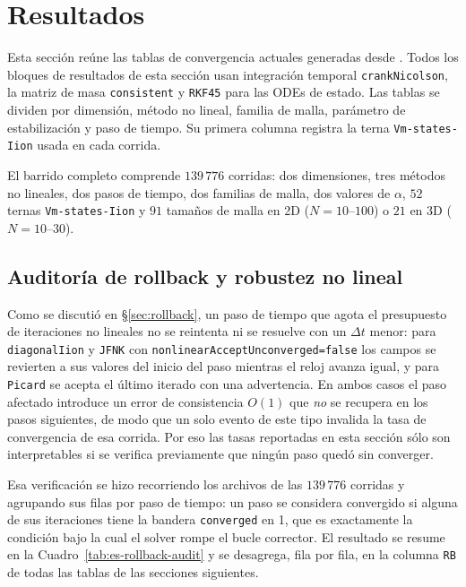 \documentclass[11pt,a4paper]{article}
\newcommand{\code}[1]{\texttt{\small #1}}
\begin{document}
\section{Resultados}

Esta sección reúne las tablas de convergencia actuales generadas desde
.
Todos los bloques de resultados de esta sección usan integración temporal \code{crankNicolson},
la matriz de masa \code{consistent} y \code{RKF45} para las ODEs de estado. Las tablas se
dividen por dimensión, método no lineal, familia de malla, parámetro de estabilización y paso
de tiempo. Su primera columna registra la terna \code{Vm-states-Iion} usada en cada corrida.

El barrido completo comprende $139\,776$ corridas: dos dimensiones, tres métodos no lineales,
dos pasos de tiempo, dos familias de malla, dos valores de $\alpha$, $52$ ternas
\code{Vm-states-Iion} y $91$ tamaños de malla en 2D ($N=10$--$100$) o $21$ en 3D
($N=10$--$30$).

\subsection{Auditoría de rollback y robustez no lineal}
\label{sec:es-auditoria-rollback-sec}

Como se discutió en \S\ref{sec:rollback}, un paso de tiempo que agota el presupuesto de
iteraciones no lineales no se reintenta ni se resuelve con un $\Delta t$ menor: para
\code{diagonalIion} y \code{JFNK} con \code{nonlinearAcceptUnconverged=false} los campos se
revierten a sus valores del inicio del paso mientras el reloj avanza igual, y para
\code{Picard} se acepta el último iterado con una advertencia. En ambos casos el paso
afectado introduce un error de consistencia $O(1)$ que \emph{no} se recupera en los pasos
siguientes, de modo que un solo evento de este tipo invalida la tasa de convergencia de esa
corrida. Por eso las tasas reportadas en esta sección sólo son interpretables si se verifica
previamente que ningún paso quedó sin converger.

Esa verificación se hizo recorriendo los archivos
 de las $139\,776$ corridas y
agrupando sus filas por paso de tiempo: un paso se considera convergido si alguna de sus
iteraciones tiene la bandera \code{converged} en 1, que es exactamente la condición bajo la
cual el solver rompe el bucle corrector. El resultado se resume en la
Cuadro~\ref{tab:es-rollback-audit} y se desagrega, fila por fila, en la columna \code{RB}
de todas las tablas de las secciones siguientes.
\end{document}
